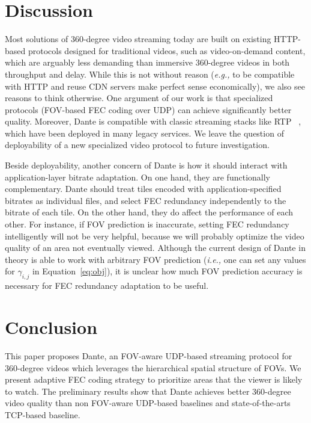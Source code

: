 \documentclass[sigconf,10pt]{acmart}
\newcommand{\eg}{{\it e.g.,}\xspace}
\newcommand{\ie}{{\it i.e.,}\xspace}
\newcommand{\tightsection}[1]{\vspace{-0.25cm}\section{#1}\vspace{-0.08cm}}
\begin{document}
% 


% 


% 


% 


\tightsection{Discussion}

\vspace{0.1cm}
Most solutions of 360-degree video streaming today are built on 
existing HTTP-based protocols designed for traditional 
videos, such as video-on-demand content, 
which are arguably less demanding than immersive 360-degree 
videos in both throughput and delay. While this is not 
without reason (\eg to be compatible with HTTP and reuse CDN servers 
make perfect sense economically), we also see reasons 
to think otherwise. One argument of our work is that specialized 
protocols (FOV-based FEC coding over UDP) can achieve 
significantly better quality. Moreover, Dante is compatible with 
classic streaming stacks like RTP ~\cite{rfc5109}, which have been 
deployed in many legacy services. We leave the question of
deployability of a new specialized video protocol to
future investigation.

\vspace{0.1cm}
Beside deployability, another concern of Dante is how it should 
interact with application-layer bitrate adaptation. On one hand, 
they are functionally complementary. Dante should treat tiles  
encoded with application-specified bitrates as individual files, 
and select FEC redundancy independently to the bitrate of each 
tile. On the other hand, they do affect the performance of each 
other. For instance, if FOV prediction is inaccurate, setting FEC 
redundancy intelligently will not be very helpful, because we 
will probably optimize the video quality of an area not 
eventually viewed. Although the current design of Dante in theory 
is able to work with arbitrary FOV prediction (\ie one can set 
any values for $\gamma_{i,j}$ in Equation~\ref{eq:obj}), it is 
unclear how much FOV prediction accuracy is necessary for FEC 
redundancy adaptation to be useful.

\vspace{-0.2cm}
\tightsection{Conclusion}
This paper proposes Dante, an FOV-aware UDP-based streaming 
protocol for 360-degree videos which leverages the hierarchical 
spatial structure of FOVs. We present adaptive 
FEC coding strategy to prioritize areas that the viewer
is likely to watch. The preliminary results show that Dante achieves
better 360-degree video quality than non FOV-aware UDP-based 
baselines and state-of-the-arts TCP-based baseline.
\end{document}
